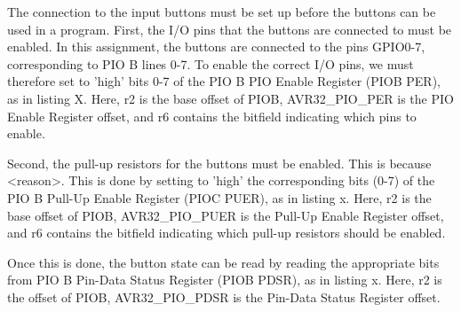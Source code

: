 The connection to the input buttons must be set up before the buttons can be used in a program.
First, the I/O pins that the buttons are connected to must be enabled.
In this assignment, the buttons are connected to the pins GPIO0-7, corresponding to PIO B lines 0-7.
To enable the correct I/O pins, we must therefore set to 'high' bits 0-7 of the PIO B PIO Enable Register (PIOB PER), as in listing X.
Here, r2 is the base offset of PIOB, AVR32\_PIO\_PER is the PIO Enable Register offset, and r6 contains the bitfield indicating which pins to enable.


Second, the pull-up resistors for the buttons must be enabled. This is because <reason>.
This is done by setting to 'high' the corresponding bits (0-7) of the PIO B Pull-Up Enable Register (PIOC PUER), as in listing x.
Here, r2 is the base offset of PIOB, AVR32\_PIO\_PUER is the Pull-Up Enable Register offset, and r6 contains the bitfield indicating which pull-up resistors should be enabled.


Once this is done, the button state can be read by reading the appropriate bits from PIO B Pin-Data Status Register (PIOB PDSR), as in listing x.
Here, r2 is the offset of PIOB, AVR32\_PIO\_PDSR is the Pin-Data Status Register offset.



